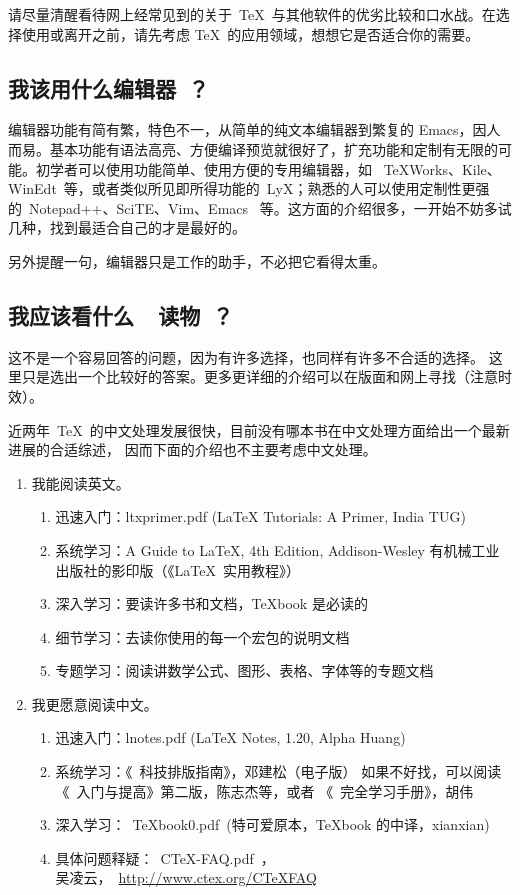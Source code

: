 请尽量清醒看待网上经常见到的关于~\TeX~与其他软件的优劣比较和口水战。在选择使用或离开之前，请先考虑
\TeX~的应用领域，想想它是否适合你的需要。


\subsection{我该用什么编辑器~？}

编辑器功能有简有繁，特色不一，从简单的纯文本编辑器到繁复的 Emacs，因人而易。基本功能有语法高亮、方便编译预览就很好了，扩充功能和定制有无限的可能。初学者可以使用功能简单、使用方便的专用编辑器，如 ~TeXWorks、Kile、WinEdt~等，或者类似所见即所得功能的~LyX；熟悉的人可以使用定制性更强的~Notepad++、SciTE、Vim、Emacs ~等。这方面的介绍很多，一开始不妨多试几种，找到最适合自己的才是最好的。

另外提醒一句，编辑器只是工作的助手，不必把它看得太重。

\subsection{我应该看什么~\XeLaTeX~读物~？}

这不是一个容易回答的问题，因为有许多选择，也同样有许多不合适的选择。
这里只是选出一个比较好的答案。更多更详细的介绍可以在版面和网上寻找（注意时效）。

近两年~\TeX~的中文处理发展很快，目前没有哪本书在中文处理方面给出一个最新进展的合适综述，
因而下面的介绍也不主要考虑中文处理。

\begin{enumerate}

\item 我能阅读英文。
\begin{enumerate}
\item 迅速入门：ltxprimer.pdf (LaTeX Tutorials: A Primer, India TUG)
\item 系统学习：A Guide to LaTeX, 4th Edition, Addison-Wesley
               有机械工业出版社的影印版（《\LaTeX{}~实用教程》）
\item 深入学习：要读许多书和文档，TeXbook 是必读的
\item 细节学习：去读你使用的每一个宏包的说明文档
\item 专题学习：阅读讲数学公式、图形、表格、字体等的专题文档
\end{enumerate}

\item 我更愿意阅读中文。
\begin{enumerate}
\item 迅速入门：lnotes.pdf (LaTeX Notes, 1.20, Alpha Huang)
\item 系统学习：《\LaTeXe{}~科技排版指南》，邓建松（电子版）
      如果不好找，可以阅读《\LaTeXe~入门与提高》第二版，陈志杰等，或者 《\LaTeXe~完全学习手册》，胡伟
\item 深入学习：~TeXbook0.pdf~(特可爱原本，TeXbook 的中译，xianxian)
\item 具体问题释疑：~CTeX-FAQ.pdf~，\\
        吴凌云，~\url{http://www.ctex.org/CTeXFAQ}~
\end{enumerate}
\end{enumerate}

